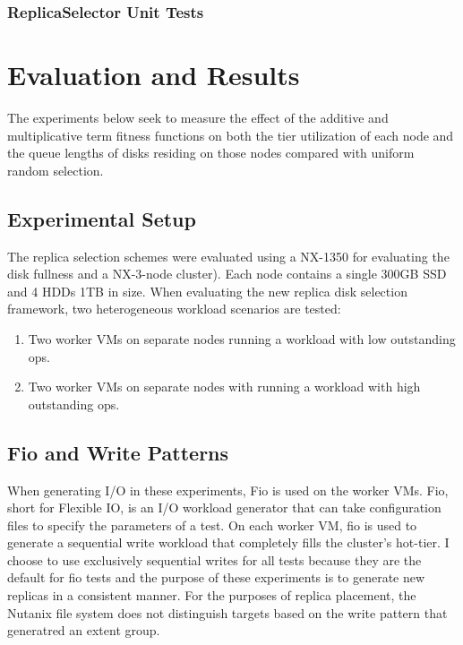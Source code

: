 \documentclass[12pt]{article}
\begin{document}

    \subsubsection{ReplicaSelector Unit Tests}

\section{Evaluation and Results}

The experiments below seek to measure the effect of the additive and
multiplicative term fitness functions on both the tier utilization of each node
and the queue lengths of disks residing on those nodes compared with uniform
random selection.

  \subsection{Experimental Setup}

  The replica selection schemes were evaluated using a NX-1350 for evaluating
  the disk fullness and a NX-3-node cluster). Each node contains a single 300GB
  SSD and 4 HDDs 1TB in size. When evaluating the new replica disk selection
  framework, two heterogeneous workload scenarios are tested:
 
  \begin{enumerate}
    \item Two worker VMs on separate nodes running a workload with low
          outstanding ops.
    \item Two worker VMs on separate nodes with running a
          workload with high outstanding ops.
  \end{enumerate}
 
  \subsection{Fio and Write Patterns}

  When generating I/O in these experiments, Fio is used on the worker VMs. Fio,
  short for Flexible IO, is an I/O workload generator that can take
  configuration files to specify the parameters of a test. On each worker VM,
  fio is used to generate a sequential write workload that completely fills the
  cluster's hot-tier. I choose to use exclusively sequential writes for all
  tests because they are the default for fio tests and the purpose of these
  experiments is to generate new replicas in a consistent manner. For the
  purposes of replica placement, the Nutanix file system does not distinguish
  targets based on the write pattern that generatred an extent group.
\end{document}
